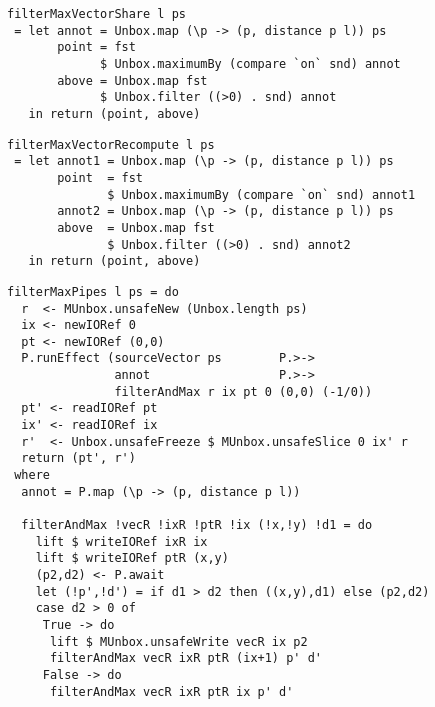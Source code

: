 \begin{lstlisting}[float=ht,label=l:a:bench:filterMaxVectorShare,caption=Vector / share implementation of \Hs/filterMax/]
filterMaxVectorShare l ps
 = let annot = Unbox.map (\p -> (p, distance p l)) ps
       point = fst
             $ Unbox.maximumBy (compare `on` snd) annot
       above = Unbox.map fst
             $ Unbox.filter ((>0) . snd) annot
   in return (point, above)
\end{lstlisting}

\begin{lstlisting}[float=ht,label=l:a:bench:filterMaxVectorRecompute,caption=Vector / recompute implementation of \Hs/filterMax/]
filterMaxVectorRecompute l ps
 = let annot1 = Unbox.map (\p -> (p, distance p l)) ps
       point  = fst
              $ Unbox.maximumBy (compare `on` snd) annot1
       annot2 = Unbox.map (\p -> (p, distance p l)) ps
       above  = Unbox.map fst
              $ Unbox.filter ((>0) . snd) annot2
   in return (point, above)
\end{lstlisting}

\begin{lstlisting}[float=ht,label=l:a:bench:filterMaxPipes,caption=Pipes implementation of \Hs/filterMax/]
filterMaxPipes l ps = do
  r  <- MUnbox.unsafeNew (Unbox.length ps)
  ix <- newIORef 0
  pt <- newIORef (0,0)
  P.runEffect (sourceVector ps        P.>->
               annot                  P.>->
               filterAndMax r ix pt 0 (0,0) (-1/0))
  pt' <- readIORef pt
  ix' <- readIORef ix
  r'  <- Unbox.unsafeFreeze $ MUnbox.unsafeSlice 0 ix' r
  return (pt', r')
 where
  annot = P.map (\p -> (p, distance p l))

  filterAndMax !vecR !ixR !ptR !ix (!x,!y) !d1 = do
    lift $ writeIORef ixR ix
    lift $ writeIORef ptR (x,y)
    (p2,d2) <- P.await
    let (!p',!d') = if d1 > d2 then ((x,y),d1) else (p2,d2)
    case d2 > 0 of
     True -> do
      lift $ MUnbox.unsafeWrite vecR ix p2
      filterAndMax vecR ixR ptR (ix+1) p' d'
     False -> do
      filterAndMax vecR ixR ptR ix p' d'
\end{lstlisting}

% 


